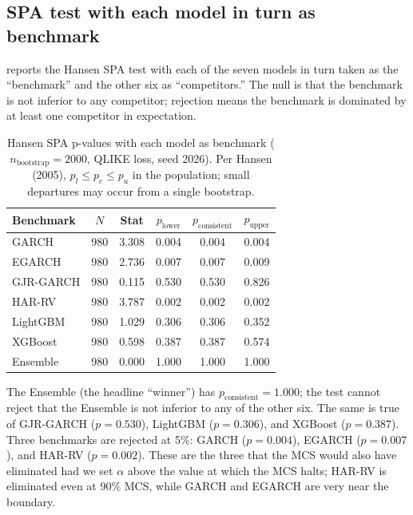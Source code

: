 \subsection{SPA test with each model in turn as benchmark}

 reports the Hansen SPA test with each of the seven models in turn taken as the ``benchmark'' and the other six as ``competitors.'' The null is that the benchmark is not inferior to any competitor; rejection means the benchmark is dominated by at least one competitor in expectation.

\begin{table}[H]
\centering
\small
\setlength{\tabcolsep}{5pt}
\caption{Hansen SPA p-values with each model as benchmark ($n_{\text{bootstrap}}=2000$, QLIKE loss, seed 2026). Per Hansen (2005), $p_l \le p_c \le p_u$ in the population; small departures may occur from a single bootstrap.}
\label{tab:demo_spa}
\begin{tabular}{l c c c c c}
\toprule
\textbf{Benchmark} & \textbf{$N$} & \textbf{Stat} & \textbf{$p_{\text{lower}}$} & \textbf{$p_{\text{consistent}}$} & \textbf{$p_{\text{upper}}$} \\
\midrule
GARCH       & 980 & 3.308 & 0.004 & 0.004 & 0.004 \\
EGARCH      & 980 & 2.736 & 0.007 & 0.007 & 0.009 \\
GJR-GARCH   & 980 & 0.115 & 0.530 & 0.530 & 0.826 \\
HAR-RV      & 980 & 3.787 & 0.002 & 0.002 & 0.002 \\
LightGBM    & 980 & 1.029 & 0.306 & 0.306 & 0.352 \\
XGBoost     & 980 & 0.598 & 0.387 & 0.387 & 0.574 \\
Ensemble    & 980 & 0.000 & 1.000 & 1.000 & 1.000 \\
\bottomrule
\end{tabular}
\end{table}

The Ensemble (the headline ``winner'') has $p_{\text{consistent}} = 1.000$; the test cannot reject that the Ensemble is not inferior to any of the other six. The same is true of GJR-GARCH ($p = 0.530$), LightGBM ($p = 0.306$), and XGBoost ($p = 0.387$). Three benchmarks are rejected at 5\%: GARCH ($p = 0.004$), EGARCH ($p = 0.007$), and HAR-RV ($p = 0.002$). These are the three that the MCS would also have eliminated had we set $\alpha$ above the value at which the MCS halts; HAR-RV is eliminated even at 90\% MCS, while GARCH and EGARCH are very near the boundary.

